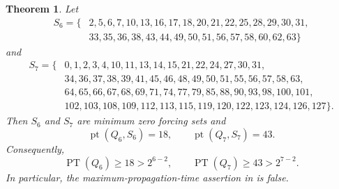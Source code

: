 \documentclass[11pt]{amsart}
\newtheorem{theorem}{Theorem}
\theoremstyle{remark}
\DeclareMathOperator{\pt}{pt}
\DeclareMathOperator{\PT}{PT}
\begin{document}
\begin{theorem}\label{thm:main}
Let
\begin{align*}
S_6=\{&2,5,6,7,10,13,16,17,18,20,21,22,25,28,29,30,31,\\
      &33,35,36,38,43,44,49,50,51,56,57,58,60,62,63\}
\end{align*}
and
\begin{align*}
S_7=\{&0,1,2,3,4,10,11,13,14,15,21,22,24,27,30,31,\\
      &34,36,37,38,39,41,45,46,48,49,50,51,55,56,57,58,63,\\
      &64,65,66,67,68,69,71,74,77,79,85,88,90,93,98,100,101,\\
      &102,103,108,109,112,113,115,119,120,122,123,124,126,127\}.
\end{align*}
Then $S_6$ and $S_7$ are minimum zero forcing sets and
\[
\pt(Q_6,S_6)=18,
\qquad
\pt(Q_7,S_7)=43.
\]
Consequently,
\[
\PT(Q_6)\ge18>2^{6-2},
\qquad
\PT(Q_7)\ge43>2^{7-2}.
\]
In particular, the maximum-propagation-time assertion in
\cite[Conjecture~4.4]{BCG} is false.
\end{theorem}
\end{document}
